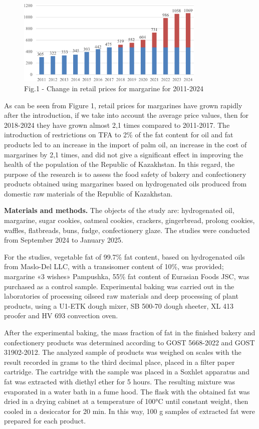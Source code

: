 \begin{figure}[H]
	\centering
	\includegraphics[width=0.8\textwidth]{media/pish4/image4}
	\caption*{Fig.1 - Change in retail prices for margarine for 2011-2024}
\end{figure}

\begin{multicols}{2}
As can be seen from Figure 1, retail prices for margarines have grown
rapidly after the introduction, if we take into account the average
price values, then for 2018-2024 they have grown almost 2,1 times
compared to 2011-2017. The introduction of restrictions on TFA to 2\% of
the fat content for oil and fat products led to an increase in the
import of palm oil, an increase in the cost of margarines by 2,1 times,
and did not give a significant effect in improving the health of the
population of the Republic of Kazakhstan. In this regard, the purpose of
the research is to assess the food safety of bakery and confectionery
products obtained using margarines based on hydrogenated oils produced
from domestic raw materials of the Republic of Kazakhstan.

{\bfseries Materials and methods.} The objects of the study are:
hydrogenated oil, margarine, sugar cookies, oatmeal cookies, crackers,
gingerbread, prolong cookies, waffles, flatbreads, buns, fudge,
confectionery glaze. The studies were conducted from September 2024 to
January 2025.

For the studies, vegetable fat of 99.7\% fat content, based on
hydrogenated oils from Maslo-Del LLC, with a transisomer content of
10\%, was provided; margarine «3 wishes» Pampushka, 55\% fat content of
Eurasian Foods JSC, was purchased as a control sample. Experimental
baking was carried out in the laboratories of processing oilseed raw
materials and deep processing of plant products, using a U1-ETK dough
mixer, SB 500-70 dough sheeter, XL 413 proofer and HV 693 convection
oven.

After the experimental baking, the mass fraction of fat in the finished
bakery and confectionery products was determined according to GOST
5668-2022 and GOST 31902-2012. The analyzed sample of products was
weighed on scales with the result recorded in grams to the third decimal
place, placed in a filter paper cartridge. The cartridge with the sample
was placed in a Soxhlet apparatus and fat was extracted with diethyl
ether for 5 hours. The resulting mixture was evaporated in a water bath
in a fume hood. The flask with the obtained fat was dried in a drying
cabinet at a temperature of 100°C until constant weight, then cooled in
a desiccator for 20 min. In this way, 100 g samples of extracted fat
were prepared for each product.


\end{multicols}
